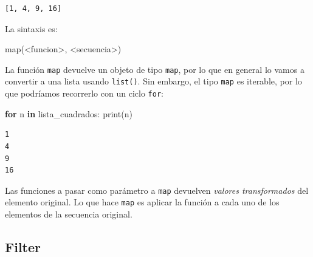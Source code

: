 \documentclass[
  letterpaper,
  DIV=11,
  numbers=noendperiod]{scrreprt}
\newenvironment{Shaded}{\begin{snugshade}}{\end{snugshade}}
\newcommand{\BuiltInTok}[1]{\textcolor[rgb]{0.00,0.23,0.31}{#1}}
\newcommand{\ControlFlowTok}[1]{\textcolor[rgb]{0.00,0.23,0.31}{\textbf{#1}}}
\newcommand{\KeywordTok}[1]{\textcolor[rgb]{0.00,0.23,0.31}{\textbf{#1}}}
\newcommand{\NormalTok}[1]{\textcolor[rgb]{0.00,0.23,0.31}{#1}}
\newcommand{\OperatorTok}[1]{\textcolor[rgb]{0.37,0.37,0.37}{#1}}
\begin{document}
\begin{verbatim}
[1, 4, 9, 16]
\end{verbatim}

La sintaxis es:

\begin{Shaded}
\begin{Highlighting}[]
\BuiltInTok{map}\NormalTok{(}\OperatorTok{\textless{}}\NormalTok{funcion}\OperatorTok{\textgreater{}}\NormalTok{, }\OperatorTok{\textless{}}\NormalTok{secuencia}\OperatorTok{\textgreater{}}\NormalTok{)}
\end{Highlighting}
\end{Shaded}

La función \texttt{map} devuelve un objeto de tipo \texttt{map}, por lo
que en general lo vamos a convertir a una lista usando \texttt{list()}.
Sin embargo, el tipo \texttt{map} es iterable, por lo que podríamos
recorrerlo con un ciclo \texttt{for}:

\begin{Shaded}
\begin{Highlighting}[]
\ControlFlowTok{for}\NormalTok{ n }\KeywordTok{in}\NormalTok{ lista\_cuadrados:}
  \BuiltInTok{print}\NormalTok{(n)}
\end{Highlighting}
\end{Shaded}

\begin{verbatim}
1
4
9
16
\end{verbatim}

\begin{tcolorbox}[enhanced jigsaw, opacitybacktitle=0.6, toptitle=1mm, toprule=.15mm, arc=.35mm, breakable, bottomrule=.15mm, opacityback=0, leftrule=.75mm, rightrule=.15mm, title=\textcolor{quarto-callout-tip-color}{\faLightbulb}\hspace{0.5em}{Tip}, left=2mm, bottomtitle=1mm, colframe=quarto-callout-tip-color-frame, colback=white, titlerule=0mm, coltitle=black, colbacktitle=quarto-callout-tip-color!10!white]

Las funciones a pasar como parámetro a \texttt{map} devuelven
\emph{valores transformados} del elemento original. Lo que hace
\texttt{map} es aplicar la función a cada uno de los elementos de la
secuencia original.

\end{tcolorbox}

\subsection{Filter}\label{filter}
\end{document}
